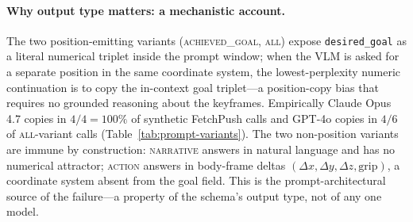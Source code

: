 \documentclass{article}
\begin{document}
\paragraph{Why output type matters: a mechanistic account.}
The two position-emitting variants (\textsc{achieved\_goal}, \textsc{all})
expose \texttt{desired\_goal} as a literal numerical triplet inside the
prompt window; when the VLM is asked for a separate position in the same
coordinate system, the lowest-perplexity numeric continuation is to copy
the in-context goal triplet---a position-copy bias that requires no
grounded reasoning about the keyframes. Empirically Claude Opus 4.7
copies in $4/4\!=\!100\%$ of synthetic FetchPush calls and GPT-4o copies
in $4/6$ of \textsc{all}-variant calls (Table~\ref{tab:prompt-variants}).
The two non-position variants are immune by construction:
\textsc{narrative} answers in natural language and has no numerical
attractor; \textsc{action} answers in body-frame deltas
$(\Delta x,\Delta y,\Delta z,\text{grip})$, a coordinate system absent
from the goal field. This is the prompt-architectural source of the
failure---a property of the schema's output type, not of any one model.
\end{document}
